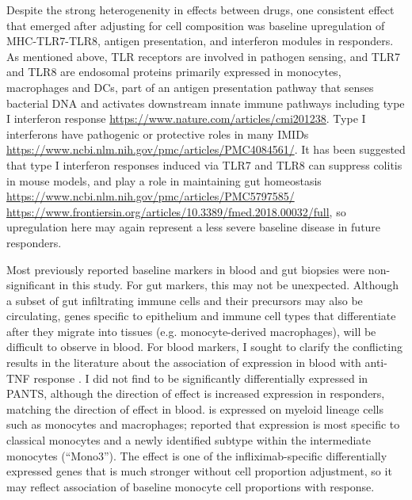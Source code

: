 Despite the strong heterogenenity in effects between drugs, one consistent effect that emerged after adjusting for cell composition was 
baseline upregulation of MHC-TLR7-TLR8, antigen presentation, and interferon modules in responders.
As mentioned above, \gls{TLR} receptors are involved in pathogen sensing, and TLR7 and TLR8 are endosomal proteins primarily expressed in monocytes, macrophages and \glspl{DC},
part of an antigen presentation pathway that senses bacterial DNA and activates downstream innate immune pathways including type I interferon response \url{https://www.nature.com/articles/cmi201238}.
Type I interferons have pathogenic or protective roles in many \glspl{IMID} \url{https://www.ncbi.nlm.nih.gov/pmc/articles/PMC4084561/}.
It has been suggested that type I interferon responses induced via TLR7 and TLR8 can suppress colitis in mouse models, and play a role in maintaining gut homeostasis
\url{https://www.ncbi.nlm.nih.gov/pmc/articles/PMC5797585/}
\url{https://www.frontiersin.org/articles/10.3389/fmed.2018.00032/full},
so upregulation here may again represent a less severe baseline disease in future responders.

Most previously reported baseline markers in blood and gut biopsies were non-significant in this study.
For gut markers, this may not be unexpected.
Although a subset of gut infiltrating immune cells and their precursors may also be circulating,
genes specific to epithelium and immune cell types that differentiate after they migrate into tissues (e.g. monocyte-derived macrophages),
will be difficult to observe in blood.
For blood markers, I sought to clarify the conflicting results in the literature about the association of  expression in blood with anti-\gls{TNF} response \autocite{gaujoux2019CellcentredMetaanalysisReveals,verstockt2019LowTREM1Expression}.
I did not find  to be significantly differentially expressed in \gls{PANTS},
although the direction of effect is increased expression in responders,
matching the \textcite{gaujoux2019CellcentredMetaanalysisReveals} direction of effect in blood.
 is expressed on myeloid lineage cells such as monocytes and macrophages;
\textcite{villani2017SinglecellRNAseqReveals} reported that  expression is most specific to 
classical monocytes and a newly identified subtype within the intermediate monocytes (\enquote{Mono3}).
The  effect is one of the infliximab-specific differentially expressed genes that is much stronger without cell proportion adjustment,
so it may reflect association of baseline monocyte cell proportions with response.

